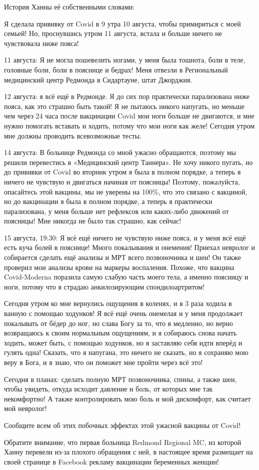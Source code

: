 История Ханны её собственными словами:

Я сделала прививку от Covid в 9 утра 10 августа, чтобы примириться с моей
семьей! Но, проснувшись утром 11 августа, встала и больше ничего не чувствовала
ниже пояса!

11 августа: Я не могла пошевелить ногами, у меня была тошнота, боли в теле,
головные боли, боли в пояснице и бедрах! Меня отвезли в Региональный медицинский
центр Редмонда в Сидартауне, штат Джорджия.


12 августа: я всё ещё в Редмонде. Я до сих пор практически парализована ниже
пояса, как это страшно быть такой! Я не пытаюсь никого напугать, но меньше чем
через 24 часа после вакцинации Covid мои ноги больше не двигаются, и мне нужно
помогать вставать и ходить, потому что мои ноги как желе! Сегодня утром мне
должны проводить всевозможные тесты.

14 августа: В больнице Редмонда со мной ужасно обращаются, поэтому мы решили
перевестись в «Медицинский центр Таннера». Не хочу никого пугать, но до прививки
от Covid во вторник утром я была в полном порядке, а теперь я ничего не чувствую
и двигаться начиная от поясницы! Поэтому, пожалуйста, опасайтесь этой вакцины,
мы не уверены на 100\%, что это связано с вакциной, но до вакцинации я была в
полном порядке, а теперь я практически парализована, у меня больше нет рефлексов
или каких-либо движений от поясницы! Мне никогда не было так страшно, как
сейчас!

15 августа, 19:30: Я всё ещё ничего не чувствую ниже пояса, и у меня всё ещё
есть куча болей в пояснице! Много покалывания и онемения! Приехал невролог и
собирается сделать ещё анализы и МРТ всего позвоночника и шеи! Он также проверил
мои анализы крови на маркеры воспаления. Похоже, что вакцина Covid-Moderna
поразила самую слабую часть моего тела, а именно поясницу и ноги, потому что я
страдаю анкилозирующим спондилоартритом!

Сегодня утром ко мне вернулись ощущения в коленях, и я 3 раза ходила в ванную с
помощью ходунков! Я всё ещё очень онемелая и у меня продолжает покалывать от
бёдер до ног, но слава Богу за то, что я медленно, но верно возвращаюсь к своим
нормальным ощущениям, и я собираюсь снова начать ходить, может быть, с помощью
ходунков, но я заставляю себя идти вперёд и гулять одна! Сказать, что я
напугана, это ничего не сказать, но я сохраняю мою веру в Бога, и я знаю, что он
поможет мне пройти через всё это!

Сегодня в планах: сделать полную МРТ позвоночника, спины, а также шеи, чтобы
увидеть, откуда исходит давление и боль, от которых мне так некомфортно! А также
контролировать мою боль и мой дискомфорт, как считает мой невролог!

Сообщите всем об этих побочных эффектах этой ужасной вакцины от Covid!

Обратите внимание, что первая больница Redmond Regional MC, из которой Ханну
перевели из-за плохого обращения с ней, в настоящее время размещает на своей
странице в Facebook рекламу вакцинации беременных женщин!
